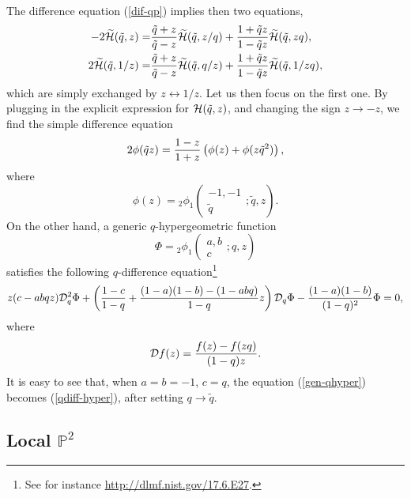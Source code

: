 \documentclass[a4paper,11pt]{article}
\theoremstyle{definition}
\newcommand{\CH}{{\cal H}}
\def\IP{{\mathbb P}}
\def\tq{{\tilde{q}}}
\newcommand{\ba}{\begin{aligned}}
\newcommand{\ea}{\end{aligned}}
\newcommand{\qhg}[6]{{}_#1\phi_{#2}
  \left(\begin{matrix}
    #3  \\
    #4
  \end{matrix} ; #5, #6\right)}
\begin{document}
 The difference equation (\ref{dif-qp}) implies then two equations, 
 \begin{equation}
 \ba
 -2 \widetilde \CH (\tq, z )=
 &{\tq+z \over \tq-z}  \widetilde \CH (\tq, z/q) +  {1+\tq z \over 1-\tq z}  \widetilde \CH (\tq, z q), \\
 2 \widetilde \CH (\tq, 1/z )=
 &{\tq+z \over \tq-z}  \widetilde \CH (\tq, q/z) +  {1+\tq z \over 1-\tq z}  \widetilde \CH (\tq, 1/z q), 
\ea
  \end{equation}
 which are simply exchanged by $z \leftrightarrow 1/z$. Let us then focus on the first one.  By plugging in the explicit expression for $\CH(\tq, z)$, and 
 changing the sign $z \rightarrow -z$, we find the simple difference equation
 \begin{equation}
 \label{qdiff-hyper}
 2 \phi(\tq z)= {1-z \over 1+z} \left( \phi( z) + \phi (z \tq^2) \right), 
 \end{equation}
 where
 \begin{equation}
   \phi( z)=\qhg{2}{1}{-1,-1}{\tq}{\tq}{z}
   . 
 \end{equation}
 On the other hand, a generic $q$-hypergeometric function 
 \begin{equation}
   \Phi=\qhg{2}{1}{a,b}{c}{q}{z}
\end{equation}
%
satisfies the following $q$-difference equation\footnote{See for
  instance \url{http://dlmf.nist.gov/17.6.E27}.}
%
 \begin{equation}
 \label{gen-qhyper}
 z (c- a b q z) {\cal D}_q^2 \Phi + \left( {1-c\over 1-q} + {(1-a)(1-b)- (1- a b q) \over 1-q}z \right) {\cal D}_q \Phi -{(1-a) (1-b) \over (1-q)^2} \Phi=0, 
 \end{equation}
where
%
\begin{equation}
{\cal D} f(z)= {f(z) - f(z q) \over (1-q) z}. 
\end{equation}
It is easy to see that, when $a=b=-1$, $c=q$, the equation (\ref{gen-qhyper}) becomes (\ref{qdiff-hyper}), after setting $q\rightarrow \tq$. 

\subsection{Local $\IP^2$}
\end{document}
